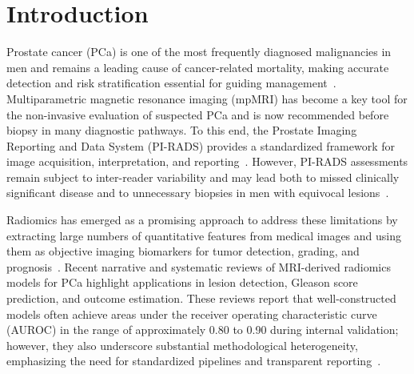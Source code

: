 \documentclass[11pt]{article}
\begin{document}
\begin{abstract}
indicating that the observed gain reflects the foundation model's pretraining
rather than its architecture alone. Center-stratified analysis revealed marked
heterogeneity, with significantly lower discrimination at one of three centers
(AUROC 0.74 vs.\ 0.84 elsewhere). A pretrained tabular foundation model thus
provided a modest but statistically supported gain over strong, calibrated
classical and deep tabular baselines, while a calibrated classical ensemble
remained a highly competitive and more parsimonious alternative; aggregate
performance again masked clinically relevant between-center variation. These
comparisons are exploratory, as model families were screened on the same cohort.
\end{abstract}



\section{Introduction}
\label{sec:intro}

Prostate cancer (PCa) is one of the most frequently diagnosed malignancies in men and remains a leading cause of cancer-related mortality, making accurate detection and risk stratification essential for guiding management~\citep{Midiri2021Diagnostics,li2022machine}. Multiparametric magnetic resonance imaging (mpMRI) has become a key tool for the non-invasive evaluation of suspected PCa and is now recommended before biopsy in many diagnostic pathways. To this end, the Prostate Imaging Reporting and Data System (PI-RADS) provides a standardized framework for image acquisition, interpretation, and reporting~\citep{Midiri2021Diagnostics,li2022machine}. However, PI-RADS assessments remain subject to inter-reader variability and may lead both to missed clinically significant disease and to unnecessary biopsies in men with equivocal lesions~\citep{Midiri2021Diagnostics}.

Radiomics has emerged as a promising approach to address these limitations by extracting large numbers of quantitative features from medical images and using them as objective imaging biomarkers for tumor detection, grading, and prognosis~\citep{Midiri2021Diagnostics,Bao2024}. Recent narrative and systematic reviews of MRI-derived radiomics models for PCa highlight applications in lesion detection, Gleason score prediction, and outcome estimation. These reviews report that well-constructed models often achieve areas under the receiver operating characteristic curve (AUROC) in the range of approximately 0.80 to 0.90 during internal validation; however, they also underscore substantial methodological heterogeneity, emphasizing the need for standardized pipelines and transparent reporting~\citep{Midiri2021Diagnostics,JZUSciB2023MRIRadiomics,collins2024tripodai}.
\end{document}
